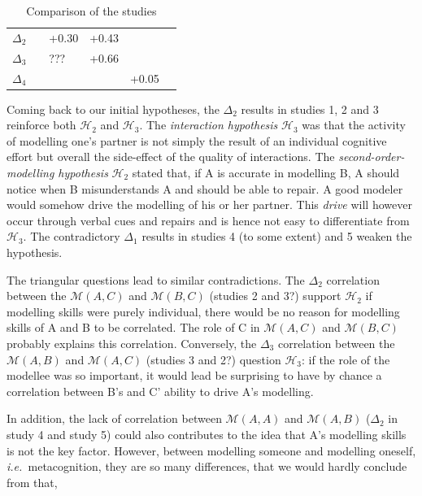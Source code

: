 \documentclass[twocolumn]{article}
\newcommand{\ie}{{\textit{i.e.\ }}}
\newcommand{\gmodel}[2]{{$\mathcal{M}(#1, #2)$}}
\begin{document}
\begin{table}[h!t]
{\begin{tabular}{p{3cm}|p{4cm}|p{4cm}|p{4cm}|p{4cm}|p{4cm}}
\textit{$\Delta_2$}                   &                                  & +0.30                           & +0.43                     &                           &                              \\
\textit{$\Delta_3$}                   &                                  & ???                             & +0.66                     &                           &                              \\
\textit{$\Delta_4$}                   &                                  &                                 &                           & +0.05                     &                             
\end{tabular}
}
\caption{Comparison of the studies}
\label{synthesis_table}
\end{table}

Coming back to our initial hypotheses, the $\Delta_2$ results in studies 1, 2
and 3 reinforce both $\mathcal{H}_{2}$ and $\mathcal{H}_{3}$. The
\emph{interaction hypothesis} $\mathcal{H}_{3}$ was that the activity of
modelling one's partner is not simply the result of an individual cognitive
effort but overall the side-effect of the quality of interactions. The
\emph{second-order-modelling hypothesis} $\mathcal{H}_{2}$ stated that, if A is
accurate in modelling B, A should notice when B misunderstands A and should be
able to repair. A good modeler would somehow drive the modelling of his or her
partner.  This \emph{drive} will however occur through verbal cues and repairs
and is hence not easy to differentiate from $\mathcal{H}_{3}$.  The
contradictory $\Delta_1$ results in studies 4 (to some extent) and 5 weaken the
hypothesis. 

The triangular questions lead to similar contradictions. The $\Delta_2$
correlation between the \gmodel{A}{C} and \gmodel{B}{C} (studies 2 and 3?)
support $\mathcal{H}_{2}$ if modelling skills were purely individual, there would
be no reason for modelling skills of A and B to be correlated.  The role of C in
\gmodel{A}{C} and \gmodel{B}{C} probably explains this correlation.  Conversely,
the $\Delta_3$ correlation between the \gmodel{A}{B} and \gmodel{A}{C} (studies
3 and 2?) question $\mathcal{H}_{3}$: if the role of the modellee was so
important, it would lead be surprising to have by chance a correlation between
B's and C' ability to drive A's modelling.

In addition, the lack of correlation between \gmodel{A}{A} and \gmodel{A}{B}
($\Delta_2$ in study 4 and study 5) could also contributes to the idea that A's
modelling skills is not the key factor. However, between modelling someone and
modelling oneself, \ie  metacognition, they are so many differences, that we
would hardly conclude from that,
\end{document}

